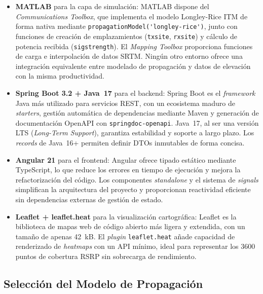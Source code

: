\begin{itemize}
  \item \textbf{MATLAB} para la capa de simulación: MATLAB dispone del
    \textit{Communications Toolbox}, que implementa el modelo Longley-Rice ITM de forma
    nativa mediante \lstinline{propagationModel('longley-rice')}, junto con funciones de
    creación de emplazamientos (\lstinline{txsite}, \lstinline{rxsite}) y cálculo de
    potencia recibida (\lstinline{sigstrength}). El \textit{Mapping Toolbox} proporciona
    funciones de carga e interpolación de datos SRTM. Ningún otro entorno ofrece una
    integración equivalente entre modelado de propagación y datos de elevación con la misma
    productividad.

  \item \textbf{Spring Boot 3.2 + Java~17} para el backend: Spring Boot es el
    \textit{framework} Java más utilizado para servicios REST, con un ecosistema maduro de
    \textit{starters}, gestión automática de dependencias mediante Maven y generación
    de documentación OpenAPI con \lstinline{springdoc-openapi}. Java~17, al ser una versión
    LTS (\textit{Long-Term Support}), garantiza estabilidad y soporte a largo plazo. Los
    \textit{records} de Java~16+ permiten definir DTOs inmutables de forma concisa.

  \item \textbf{Angular 21} para el frontend: Angular ofrece tipado estático mediante
    TypeScript, lo que reduce los errores en tiempo de ejecución y mejora la
    refactorización del código. Los componentes \textit{standalone} y el sistema de
    \textit{signals} simplifican la arquitectura del proyecto y proporcionan reactividad
    eficiente sin dependencias externas de gestión de estado.

  \item \textbf{Leaflet + leaflet.heat} para la visualización cartográfica: Leaflet es la
    biblioteca de mapas web de código abierto más ligera y extendida, con un tamaño de
    apenas 42~kB. El \textit{plugin} \lstinline{leaflet.heat} añade capacidad de
    renderizado de \textit{heatmaps} con un API mínimo, ideal para representar los 3600
    puntos de cobertura RSRP sin sobrecarga de rendimiento.
\end{itemize}

\subsection{Selección del Modelo de Propagación}
\label{subsec:seleccion_modelo}

